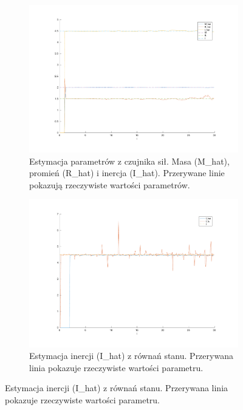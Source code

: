 \documentclass[a4paper, 10pt]{article}
\begin{document}
\begin{figure}
\begin{subfigure}{.5\textwidth}
		\includegraphics[width=\linewidth]{test_c}
		\caption{Estymacja parametrów z czujnika sił. Masa (M\_hat), promień (R\_hat) i inercja (I\_hat). Przerywane linie pokazują rzeczywiste wartości parametrów.}
		\label{fig:system_c}
	\end{subfigure}%
	\begin{subfigure}{.5\textwidth}
		\centering
		\includegraphics[width=\linewidth]{test_r}
		\caption{Estymacja inercji (I\_hat) z równań stanu. Przerywana linia pokazuje rzeczywiste wartości parametru.}
		\label{fig:system_r}
	\end{subfigure}


\end{figure}
\end{document}
